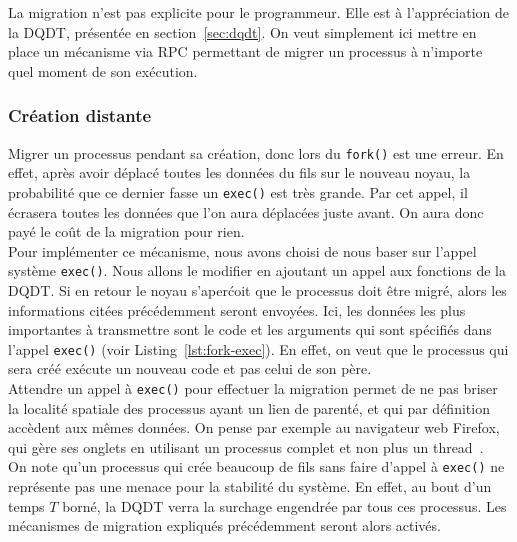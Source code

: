         La migration n'est pas explicite pour le programmeur. Elle est à
        l'appréciation de la DQDT, présentée en section~\ref{sec:dqdt}. On veut
        simplement ici mettre en place un mécanisme via RPC permettant de migrer
        un processus à n'importe quel moment de son exécution.

      \subsubsection{Création distante}

        Migrer un processus pendant sa création, donc lors du \texttt{fork()}
        est une erreur. En effet, après avoir déplacé toutes les données du fils
        sur le nouveau noyau, la probabilité que ce dernier fasse un
        \texttt{exec()} est très grande. Par cet appel, il écrasera toutes les
        données que l'on aura déplacées juste avant. On aura donc payé le coût
        de la migration pour rien.\\

        Pour implémenter ce mécanisme, nous avons choisi de nous baser sur
        l'appel système \texttt{exec()}. Nous allons le modifier en ajoutant un
        appel aux fonctions de la DQDT. Si en retour le noyau s'aperćoit que le
        processus doit être migré, alors les informations citées précédemment
        seront envoyées. Ici, les données les plus importantes à transmettre
        sont le code et les arguments qui sont spécifiés dans l'appel
        \texttt{exec()} (voir Listing~\ref{lst:fork-exec}). En effet, on veut
        que le processus qui sera créé exécute un nouveau code et pas celui de
        son père.\\

        Attendre un appel à \texttt{exec()} pour effectuer la migration permet
        de ne pas briser la localité spatiale des processus ayant un lien de
        parenté, et qui par définition accèdent aux mêmes données. On pense par
        exemple au navigateur web Firefox, qui gère ses onglets en utilisant un
        processus complet et non plus un thread~\citep{mozillaElectrolysis}.\\

        On note qu'un processus qui crée beaucoup de fils sans faire d'appel à
        \texttt{exec()} ne représente pas une menace pour la stabilité du
        système. En effet, au bout d'un temps $T$ borné, la DQDT verra la
        surchage engendrée par tous ces processus. Les mécanismes de migration
        expliqués précédemment seront alors activés.

